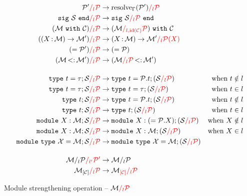 \begin{align*}
  \Ostrengthen{l}{\iP}{\iP'}
  &\to \Ostrengthen{l}{\iP}{\resolve{\E}{\iP'}}\\
  \Ostrengthen{l}{\iP}{\Ssig{\iS}}
  &\to \Ssig{\Ostrengthen{l}{\iP}{\iS}}\\
  \Ostrengthen{l}{\iP}{(\Swith{\iM}{\iC})}
  &\to \Swith{(\Ostrengthen{l,\operatorname{id}(\iC)}{\iP}{\iM})}{\iC}\\
  \Ostrengthen{l}{\iP}{(\Sfunctor{\ix}{\iM}{\iM'})}
  &\to \Sfunctor{\ix}{\iM}{\Ostrengthen{l}{\iP(X)}{\iM'}}\\
  \Ostrengthen{l}{\iP}{\Salias{\iP'}}
  &\to \Salias{\iP}\\
  \Ostrengthen{l}{\iP}{\Stransp{\iM}{\iM'}}
  &\to \Stransp{\Ostrengthen{l}{\iP}{\iM}}{\iM'}\\[4mm]
  \Ostrengthen{l}{\iP}{\Stype{t}{\tau};\iS}
  &\to \Stype{t}{\iP.t};(\Ostrengthen{l}{\iP}{\iS}) &\text{when } t\notin l\\
  \Ostrengthen{l}{\iP}{\Stype{t}{\tau};\iS}
  &\to \Stype{t}{\tau};(\Ostrengthen{l}{\iP}{\iS}) &\text{when } t\in l\\
  \Ostrengthen{l}{\iP}{\Stypeabs{t};\iS}
  &\to \Stype{t}{\iP.t};(\Ostrengthen{l}{\iP}{\iS}) &\text{when } t\notin l\\
  \Ostrengthen{l}{\iP}{\Stypeabs{t};\iS}
  &\to \Stypeabs{t};(\Ostrengthen{l}{\iP}{\iS}) &\text{when } t\in l\\
  \Ostrengthen{l}{\iP}{\Smodulety{\ix}{\iM};\iS}
  &\to \Smodulety{\ix}{\Salias{\iP.\ix}};
    (\Ostrengthen{l}{\iP}{\iS}) &\text{when } \ix\notin l\\
  \Ostrengthen{l}{\iP}{\Smodulety{\ix}{\iM};\iS}
  &\to \Smodulety{\ix}{\iM};
    (\Ostrengthen{l}{\iP}{\iS})  &\text{when } \ix\in l\\
  \Ostrengthen{l}{\iP}{\Smoduletype{\iX}{\iM};\iS}
  &\to \Smoduletype{\iX}{\iM};
    (\Ostrengthen{l}{\iP}{\iS}) \\[4mm]
  \Ostrengthen{l'}{\iP'}{\Sstrengthen{l}{\iP}{\iM}}
  &\to \Sstrengthen{l}{\iP}{\iM}\\
  \Ostrengthen{l}{\iP}{\Senrich{\iC}{\iM}}
  &\to \Ostrengthen{l}{\iP}{\Oenrich{\iC}{\iM}}\\
\end{align*}\vspace{-3mm}
\caption{Module strengthening operation -- $\Ostrengthen{l}{\iP}{\iM}$}
\label{module:strengthen}

